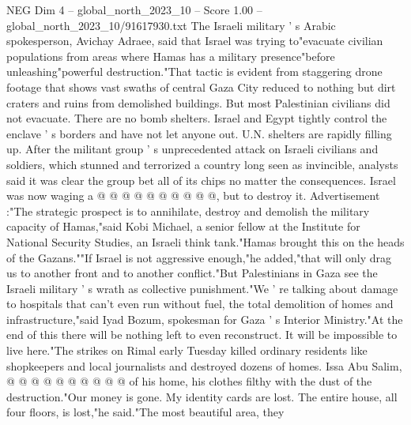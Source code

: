 \begin{textsample}{NEG Dim 4 – global\_north\_2023\_10 – Score 1.00 – global\_north\_2023\_10/91617930.txt}
The Israeli military ' s Arabic spokesperson, Avichay Adraee, said that Israel was trying to"evacuate civilian populations from areas where Hamas has a military presence"before unleashing"powerful destruction."That tactic is evident from staggering drone footage that shows vast swaths of central Gaza City reduced to nothing but dirt craters and ruins from demolished buildings.
But most Palestinian civilians did not evacuate.
There are no bomb shelters.
Israel and Egypt tightly control the enclave ' s borders and have not let anyone out.
U.N. shelters are rapidly filling up.
After the militant group ' s unprecedented attack on Israeli civilians and soldiers, which stunned and terrorized a country long seen as invincible, analysts said it was clear the group bet all of its chips no matter the consequences.
Israel was now waging a @ @ @ @ @ @ @ @ @ @, but to destroy it.
Advertisement :"The strategic prospect is to annihilate, destroy and demolish the military capacity of Hamas,"said Kobi Michael, a senior fellow at the Institute for National Security Studies, an Israeli think tank."Hamas brought this on the heads of the Gazans.""If Israel is not aggressive enough,"he added,"that will only drag us to another front and to another conflict."But Palestinians in Gaza see the Israeli military ' s wrath as collective punishment."We ' re talking about damage to hospitals that can't even run without fuel, the total demolition of homes and infrastructure,"said Iyad Bozum, spokesman for Gaza ' s Interior Ministry."At the end of this there will be nothing left to even reconstruct.
It will be impossible to live here."The strikes on Rimal early Tuesday killed ordinary residents like shopkeepers and local journalists and destroyed dozens of homes.
Issa Abu Salim, @ @ @ @ @ @ @ @ @ @ of his home, his clothes filthy with the dust of the destruction."Our money is gone.
My identity cards are lost.
The entire house, all four floors, is lost,"he said."The most beautiful area, they

\end{textsample}
